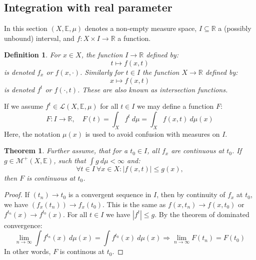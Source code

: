 \documentclass[12pt, a4paper]{article}
\newtheorem{theorem}{Theorem}[section]
\newtheorem{definition}{Definition}[section]
\numberwithin{equation}{section}
\begin{document}
\subsection{Integration with real parameter}
In this section $(X,\mathbb{E},\mu)$ denotes a non-empty measure space, $I\subseteq\mathbb{R}$ a (possibly unbound) interval, and $f: X\times I\rightarrow\mathbb{R}$ a function.

\begin{definition}
For $x\in X$, the function $I\rightarrow\mathbb{R}$ defined by:
\begin{equation}
t\mapsto f(x,t)
\end{equation}
is denoted $f_x$ or $f(x,\cdot)$. Similarly for $t\in I$ the function $X\rightarrow\mathbb{R}$ defined by:
\begin{equation}
x\mapsto f(x,t)
\end{equation}
is denoted $f^t$ or $f(\cdot,t)$. These are also known as intersection functions. 
\end{definition}

If we assume $f^t\in\mathcal{L}(X,\mathbb{E},\mu)$ for all $t\in I$ we may define a function $F$:
\begin{equation}
F: I\rightarrow\mathbb{R},\quad F(t)=\int_X f^t\ d\mu=\int_X f(x,t)\ d\mu(x)
\end{equation}
Here, the notation $\mu(x)$ is used to avoid confusion with measures on $I$.

\begin{theorem}
Further assume, that for a $t_0\in I$, all $f_x$ are continuous at $t_0$. If $g\in\mathcal{M}^+(X,\mathbb{E})$, such that $\int g\ d\mu<\infty$ and:
\begin{equation}
\forall t\in I\ \forall x\in X: |f(x,t)|\le g(x),
\end{equation}
then $F$ is continuous at $t_0$.
\end{theorem}
\begin{proof}
If $(t_n)\rightarrow t_0$ is a convergent sequence in $I$, then by continuity of $f_x$ at $t_0$, we have $(f_x(t_n))\rightarrow f_x(t_0)$. This is the same as $f(x,t_n)\rightarrow f(x,t_0)$ or $f^{t_n}(x)\rightarrow f^{t_0}(x)$. For all $t\in I$ we have $|f^t|\le g$. By the theorem of dominated convergence:
\begin{equation}
\lim_{n\rightarrow\infty}\int f^{t_n}(x)\ d\mu(x)=\int f^{t_0}(x)\ d\mu(x)\Rightarrow\lim_{n\rightarrow\infty}F(t_n)=F(t_0)
\end{equation}
In other words, $F$ is continous at $t_0$.
\end{proof}
\end{document}
